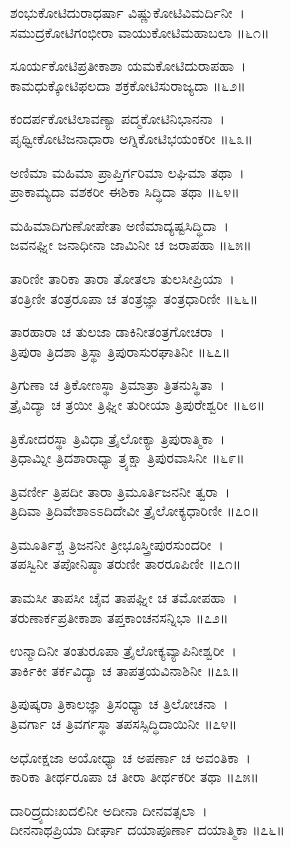 ಶಂಭುಕೋಟಿದುರಾಧರ್ಷಾ ವಿಷ್ಣುಕೋಟಿವಿಮರ್ದಿನೀ~।\\
ಸಮುದ್ರಕೋಟಿಗಂಭೀರಾ ವಾಯುಕೋಟಿಮಹಾಬಲಾ ॥೬೧॥

ಸೂರ್ಯಕೋಟಿಪ್ರತೀಕಾಶಾ ಯಮಕೋಟಿದುರಾಪಹಾ~।\\
ಕಾಮಧುಕ್ಕೋಟಿಫಲದಾ ಶಕ್ರಕೋಟಿಸುರಾಜ್ಯದಾ ॥೬೨॥

ಕಂದರ್ಪಕೋಟಿಲಾವಣ್ಯಾ ಪದ್ಮಕೋಟಿನಿಭಾನನಾ~।\\
ಪೃಥ್ವೀಕೋಟಿಜನಾಧಾರಾ ಅಗ್ನಿಕೋಟಿಭಯಂಕರೀ ॥೬೩॥

ಅಣಿಮಾ ಮಹಿಮಾ ಪ್ರಾಪ್ತಿರ್ಗರಿಮಾ ಲಘಿಮಾ ತಥಾ~।\\
ಪ್ರಾಕಾಮ್ಯದಾ ವಶಕರೀ ಈಶಿಕಾ ಸಿದ್ಧಿದಾ ತಥಾ ॥೬೪॥

ಮಹಿಮಾದಿಗುಣೋಪೇತಾ ಅಣಿಮಾದ್ಯಷ್ಟಸಿದ್ಧಿದಾ~।\\
ಜವನಘ್ನೀ ಜನಾಧೀನಾ ಜಾಮಿನೀ ಚ ಜರಾಪಹಾ ॥೬೫॥

ತಾರಿಣೀ ತಾರಿಕಾ ತಾರಾ ತೋತಲಾ ತುಲಸೀಪ್ರಿಯಾ~।\\
ತಂತ್ರಿಣೀ ತಂತ್ರರೂಪಾ ಚ ತಂತ್ರಜ್ಞಾ ತಂತ್ರಧಾರಿಣೀ ॥೬೬॥

ತಾರಹಾರಾ ಚ ತುಲಜಾ ಡಾಕಿನೀತಂತ್ರಗೋಚರಾ~।\\
ತ್ರಿಪುರಾ ತ್ರಿದಶಾ ತ್ರಿಸ್ಥಾ ತ್ರಿಪುರಾಸುರಘಾತಿನೀ ॥೬೭॥

ತ್ರಿಗುಣಾ ಚ ತ್ರಿಕೋಣಸ್ಥಾ ತ್ರಿಮಾತ್ರಾ ತ್ರಿತನುಸ್ಥಿತಾ~।\\
ತ್ರೈವಿದ್ಯಾ ಚ ತ್ರಯೀ ತ್ರಿಘ್ನೀ ತುರೀಯಾ ತ್ರಿಪುರೇಶ್ವರೀ ॥೬೮॥

ತ್ರಿಕೋದರಸ್ಥಾ ತ್ರಿವಿಧಾ ತ್ರೈಲೋಕ್ಯಾ ತ್ರಿಪುರಾತ್ಮಿಕಾ~।\\
ತ್ರಿಧಾಮ್ನೀ ತ್ರಿದಶಾರಾಧ್ಯಾ ತ್ರ್ಯಕ್ಷಾ ತ್ರಿಪುರವಾಸಿನೀ ॥೬೯॥

ತ್ರಿವರ್ಣೀ ತ್ರಿಪದೀ ತಾರಾ ತ್ರಿಮೂರ್ತಿಜನನೀ ತ್ವರಾ~।\\
ತ್ರಿದಿವಾ ತ್ರಿದಿವೇಶಾಽಽದಿದೇವೀ ತ್ರೈಲೋಕ್ಯಧಾರಿಣೀ ॥೭೦॥

ತ್ರಿಮೂರ್ತಿಶ್ಚ ತ್ರಿಜನನೀ ತ್ರೀಭೂಸ್ತ್ರೀಪುರಸುಂದರೀ~।\\
ತಪಸ್ವಿನೀ ತಪೋನಿಷ್ಠಾ ತರುಣೀ ತಾರರೂಪಿಣೀ ॥೭೧॥

ತಾಮಸೀ ತಾಪಸೀ ಚೈವ ತಾಪಘ್ನೀ ಚ ತಮೋಪಹಾ~।\\
ತರುಣಾರ್ಕಪ್ರತೀಕಾಶಾ ತಪ್ತಕಾಂಚನಸನ್ನಿಭಾ ॥೭೨॥

ಉನ್ಮಾದಿನೀ ತಂತುರೂಪಾ ತ್ರೈಲೋಕ್ಯವ್ಯಾಪಿನೀಶ್ವರೀ~।\\
ತಾರ್ಕಿಕೀ ತರ್ಕವಿದ್ಯಾ ಚ ತಾಪತ್ರಯವಿನಾಶಿನೀ ॥೭೩॥

ತ್ರಿಪುಷ್ಕರಾ ತ್ರಿಕಾಲಜ್ಞಾ ತ್ರಿಸಂಧ್ಯಾ ಚ ತ್ರಿಲೋಚನಾ~।\\
ತ್ರಿವರ್ಗಾ ಚ ತ್ರಿವರ್ಗಸ್ಥಾ ತಪಸಸ್ಸಿದ್ಧಿದಾಯಿನೀ ॥೭೪॥

ಅಧೋಕ್ಷಜಾ ಅಯೋಧ್ಯಾ ಚ ಅಪರ್ಣಾ ಚ ಅವಂತಿಕಾ~।\\
ಕಾರಿಕಾ ತೀರ್ಥರೂಪಾ ಚ ತೀರಾ ತೀರ್ಥಕರೀ ತಥಾ ॥೭೫॥

ದಾರಿದ್ರ್ಯದುಃಖದಲಿನೀ ಅದೀನಾ ದೀನವತ್ಸಲಾ~।\\
ದೀನನಾಥಪ್ರಿಯಾ ದೀರ್ಘಾ ದಯಾಪೂರ್ಣಾ ದಯಾತ್ಮಿಕಾ ॥೭೬॥

